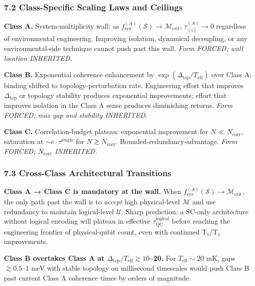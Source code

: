 \documentclass[
  11pt,
  a4paper,
]{article}
\begin{document}
\subsubsection{7.2 Class-Specific Scaling Laws and
Ceilings}\label{class-specific-scaling-laws-and-ceilings}

\textbf{Class A.} System-multiplicity wall: as
\(f_{\mathrm{sys}}^{(A)}(\mathcal{S}) \to \mathcal{M}_{\mathrm{crit}}\),
\(\tau_{(\mathrm{i})}^{(A)} \to 0\) regardless of environmental
engineering. Improving isolation, dynamical decoupling, or any
environmental-side technique cannot push past this wall. \emph{Form
FORCED; wall location INHERITED.}

\textbf{Class B.} Exponential coherence enhancement by
\(\exp(\Delta_{\mathrm{top}}/T_{\mathrm{eff}})\) over Class A; binding
shifted to topology-perturbation rate. Engineering effort that improves
\(\Delta_{\mathrm{top}}\) or topology stability produces exponential
improvements; effort that improves isolation in the Class A sense
produces diminishing returns. \emph{Form FORCED; max gap and stability
INHERITED.}

\textbf{Class C.} Correlation-budget plateau: exponential improvement
for \(N \ll N_{\mathrm{corr}}\), saturation at
\(\sim e\cdot\tau^{\mathrm{single}}\) for
\(N \gtrsim N_{\mathrm{corr}}\). Bounded-redundancy-advantage.
\emph{Form FORCED; \(N_{\mathrm{corr}}\) INHERITED.}

\subsubsection{7.3 Cross-Class Architectural
Transitions}\label{cross-class-architectural-transitions}

\textbf{Class A → Class C is mandatory at the wall.} When
\(f_{\mathrm{sys}}^{(A)}(\mathcal{S}) \to \mathcal{M}_{\mathrm{crit}}\),
the only path past the wall is to \emph{accept} high physical-level
\(\mathcal{M}\) and use redundancy to maintain logical-level
\(\mathcal{U}\). Sharp prediction: a SC-only architecture without
logical encoding will plateau in effective
\(\tau_{\mathrm{QC}}^{\mathrm{logical}}\) before reaching the
engineering frontier of physical-qubit count, even with continued T₁/T₂
improvements.

\textbf{Class B overtakes Class A at
\(\Delta_{\mathrm{top}}/T_{\mathrm{eff}} \gtrsim 10\)--20.} For
\(T_{\mathrm{eff}} \sim 20\) mK, gaps \(\gtrsim 0.5\)--1 meV with stable
topology on millisecond timescales would push Class B past current Class
A coherence times by orders of magnitude.
\end{document}
